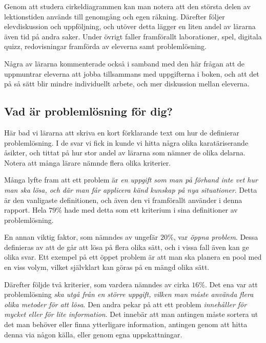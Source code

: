 \textcolor{lila}{Genom att studera cirkeldiagrammen kan man notera att den största delen av lektionstiden används till genomgång och egen räkning. Därefter följer elevdiskussion och uppföljning, och utöver detta lägger en liten andel av lärarna även tid på andra saker. Under övrigt faller framförallt laborationer, spel, digitala quizz, redovisningar framförda av eleverna samt problemlösning.}

\textcolor{lila}{Några av lärarna kommenterade också i samband med den här frågan att de uppmuntrar eleverna att jobba tillsammans med uppgifterna i boken, och att det på så sätt blir mindre individuellt arbete, och mer diskussion mellan eleverna.}

\subsection{Vad är problemlösning för dig?}
\textcolor{lila}{Här bad vi lärarna att skriva en kort förklarande text om hur de definierar problemlösning. I de svar vi fick in kunde vi hitta några olika karatäriserande åsikter, och tittat på hur stor andel av lärarna som nämner de olika delarna. Notera att många lärare nämnde flera olika kriterier.}

\textcolor{lila}{Många lyfte fram att ett problem är \textsl{en uppgift som man på förhand inte vet hur man ska lösa, och där man får applicera känd kunskap på nya situationer}. Detta är den vanligaste definitionen, och även den vi framförallt använder i denna rapport. Hela $79\%$ hade med detta som ett kriterium i sina definitioner av problemlösning.}

\textcolor{lila}{En annan viktig faktor, som nämndes av ungefär $20\%$, var \textsl{öppna problem}. Dessa definieras av att de går att lösa på flera olika sätt, och i vissa fall även kan ge olika svar. Ett exempel på ett öppet problem är att man ska planera en pool med en viss volym, vilket självklart kan göras på en mängd olika sätt.}

\textcolor{lila}{Därefter följde två kriterier, som vardera nämndes av cirka $16\%$. Det ena var att problemlösning \textsl{ska utgå från en större uppgift, vilken man måste använda flera olika metoder för att lösa}. Den andra pekar på att ett problem \textsl{innehåller för mycket eller för lite information}. Det innebär att man antingen måste sortera ut det man behöver eller finna ytterligare information, antingen genom att hitta denna via någon källa, eller genom egna uppskattningar.}

